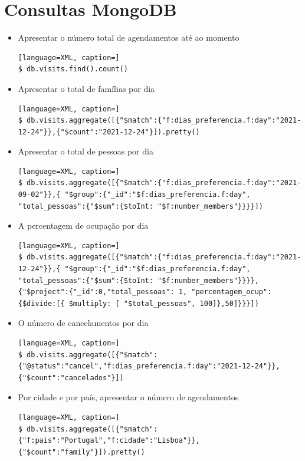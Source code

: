 \documentclass{article}
\begin{document}
\section{Consultas MongoDB}

\begin{itemize}
    \item Apresentar o número total de agendamentos até ao momento
\begin{lstlisting}[language=XML, caption=]
$ db.visits.find().count()
\end{lstlisting}
    \item Apresentar o total de famílias por dia
\begin{lstlisting}[language=XML, caption=]
$ db.visits.aggregate([{"$match":{"f:dias_preferencia.f:day":"2021-12-24"}},{"$count":"2021-12-24"}]).pretty() 
\end{lstlisting}
    \item Apresentar o total de pessoas por dia
\begin{lstlisting}[language=XML, caption=]
$ db.visits.aggregate([{"$match":{"f:dias_preferencia.f:day":"2021-09-02"}},{ "$group":{"_id":"$f:dias_preferencia.f:day", "total_pessoas":{"$sum":{$toInt: "$f:number_members"}}}}])
\end{lstlisting}
    \item A percentagem de ocupação por dia
\begin{lstlisting}[language=XML, caption=]
$ db.visits.aggregate([{"$match":{"f:dias_preferencia.f:day":"2021-12-24"}},{ "$group":{"_id":"$f:dias_preferencia.f:day", "total_pessoas":{"$sum":{$toInt: "$f:number_members"}}}},{"$project":{"_id":0,"total_pessoas": 1, "percentagem_ocup":{$divide:[{ $multiply: [ "$total_pessoas", 100]},50]}}}])
\end{lstlisting}
    \item O número de cancelamentos por dia
\begin{lstlisting}[language=XML, caption=]
$ db.visits.aggregate([{"$match":{"@status":"cancel","f:dias_preferencia.f:day":"2021-12-24"}},{"$count":"cancelados"}])
\end{lstlisting}
    \item Por cidade e por país, apresentar o número de agendamentos
\begin{lstlisting}[language=XML, caption=]
$ db.visits.aggregate([{"$match":{"f:pais":"Portugal","f:cidade":"Lisboa"}},{"$count":"family"}]).pretty()
\end{lstlisting}
\end{itemize}
\end{document}
